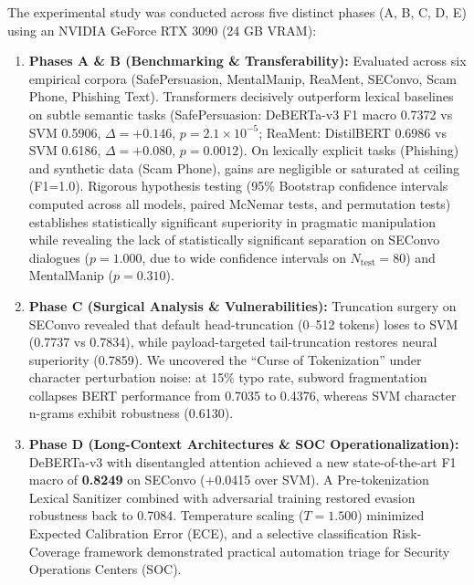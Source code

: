 \documentclass[12pt,a4paper,twoside]{report}
\begin{document}
The experimental study was conducted across five distinct phases (A, B, C, D, E) using an NVIDIA GeForce RTX 3090 (24 GB VRAM):
\begin{enumerate}[leftmargin=*]
  \item \textbf{Phases A \& B (Benchmarking \& Transferability):} Evaluated across six empirical corpora (SafePersuasion, MentalManip, ReaMent, SEConvo, Scam Phone, Phishing Text). Transformers decisively outperform lexical baselines on subtle semantic tasks (SafePersuasion: DeBERTa-v3 F1 macro 0.7372 vs SVM 0.5906, $\Delta=+0.146$, $p = 2.1 \times 10^{-5}$; ReaMent: DistilBERT 0.6986 vs SVM 0.6186, $\Delta=+0.080$, $p = 0.0012$). On lexically explicit tasks (Phishing) and synthetic data (Scam Phone), gains are negligible or saturated at ceiling (F1=1.0). Rigorous hypothesis testing (95\% Bootstrap confidence intervals computed across all models, paired McNemar tests, and permutation tests) establishes statistically significant superiority in pragmatic manipulation while revealing the lack of statistically significant separation on SEConvo dialogues ($p = 1.000$, due to wide confidence intervals on $N_{\text{test}}=80$) and MentalManip ($p = 0.310$).
  \item \textbf{Phase C (Surgical Analysis \& Vulnerabilities):} Truncation surgery on SEConvo revealed that default head-truncation (0--512 tokens) loses to SVM (0.7737 vs 0.7834), while payload-targeted tail-truncation restores neural superiority (0.7859). We uncovered the ``Curse of Tokenization'' under character perturbation noise: at 15\% typo rate, subword fragmentation collapses BERT performance from 0.7035 to 0.4376, whereas SVM character n-grams exhibit robustness (0.6130).
  \item \textbf{Phase D (Long-Context Architectures \& SOC Operationalization):} DeBERTa-v3 with disentangled attention achieved a new state-of-the-art F1 macro of \textbf{0.8249} on SEConvo (+0.0415 over SVM). A Pre-tokenization Lexical Sanitizer combined with adversarial training restored evasion robustness back to 0.7084. Temperature scaling ($T=1.500$) minimized Expected Calibration Error (ECE), and a selective classification Risk-Coverage framework demonstrated practical automation triage for Security Operations Centers (SOC).

\end{enumerate}
\end{document}
